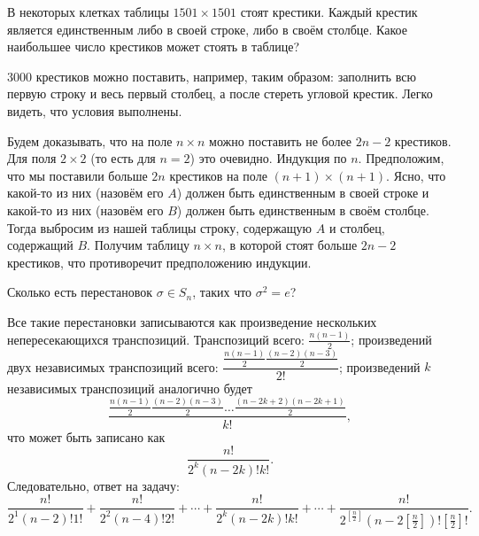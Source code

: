 \documentclass[a4paper,12pt]{article}
\begin{document}
    \problem  В некоторых клетках таблицы $1501 \times 1501$ стоят крестики. Каждый крестик является единственным либо в своей строке, либо в своём столбце. Какое наибольшее число крестиков может стоять в таблице?
    \begin{solution}
        3000 крестиков можно поставить, например, таким образом: заполнить всю первую строку и весь первый столбец, а после стереть угловой крестик. Легко видеть, что условия выполнены. \par
        Будем доказывать, что на поле $n \times n$ можно поставить не более $2n - 2$ крестиков. Для поля $2 \times 2$ (то есть для $n = 2$) это очевидно. Индукция по $n$. Предположим, что мы поставили больше $2n$ крестиков на поле $(n+1) \times (n+1)$. Ясно, что какой-то из них (назовём его $A$) должен быть единственным в своей строке и какой-то из них (назовём его $B$) должен быть единственным в своём столбце. Тогда выбросим из нашей таблицы строку, содержащую $A$ и столбец, содержащий $B$. Получим таблицу $n \times n$, в которой стоят больше $2n - 2$ крестиков, что противоречит предположению индукции.
    \end{solution}
    
    \problem Сколько есть перестановок $\sigma \in S_n$, таких что $\sigma^2 = e$?
    \begin{solution}
        Все такие перестановки записываются как произведение нескольких непересекающихся транспозиций. Транспозиций всего: $\frac{n(n-1)}{2}$; произведений двух независимых транспозиций всего: $\dfrac{\frac{n(n-1)}{2}\frac{(n-2)(n-3)}{2}}{2!}$; произведений $k$ независимых транспозиций аналогично будет
        \begin{equation*}
            \frac{\frac{n(n-1)}{2}\frac{(n-2)(n-3)}{2}\ldots\frac{(n-2k+2)(n-2k+1)}{2}}{k!},
        \end{equation*}
        что может быть записано как
        \begin{equation*}
            \frac{n!}{2^k(n-2k)!k!}.
        \end{equation*}
        Следовательно, ответ на задачу:
        \begin{equation*}
            \frac{n!}{2^1(n-2)!1!} + \frac{n!}{2^2(n-4)!2!} + \cdots + \frac{n!}{2^k(n-2k)!k!} + \cdots + \frac{n!}{2^{\left[\frac{n}{2}\right]}(n-2\left[\frac{n}{2}\right])!\left[\frac{n}{2}\right]!}.
        \end{equation*}
    \end{solution}
\end{document}
